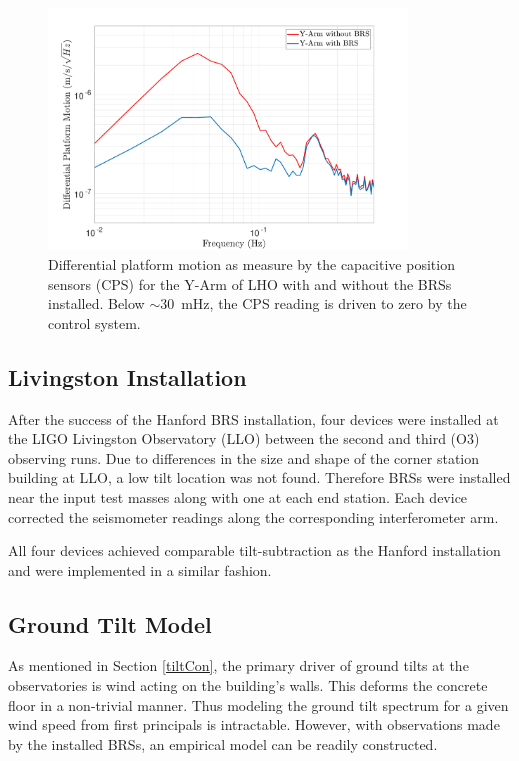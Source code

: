 \documentclass [12pt, proquest]{uwthesis}[2019]
\begin{document}
\begin{figure}[!h]
\begin{center}
\includegraphics[width=0.85\textwidth]{BRSArmMotion.pdf}
\caption[Differential platform motion ]{Differential platform motion as measure by the capacitive position sensors (CPS) for the Y-Arm of LHO with and without the BRSs installed. Below $\sim$30~mHz, the CPS reading is driven to zero by the control system.}
\label{armMotion}
\end{center}
\end{figure}

\subsection{Livingston Installation}

\quad After the success of the Hanford BRS installation, four devices were installed at the LIGO Livingston Observatory (LLO) between the second and third (O3) observing runs. Due to differences in the size and shape of the corner station building at LLO, a low tilt location was not found. Therefore BRSs were installed near the input test masses along with one at each end station. Each device corrected the seismometer readings along the corresponding interferometer arm. 

All four devices achieved comparable tilt-subtraction as the Hanford installation and were implemented in a similar fashion. 

\subsection{Ground Tilt Model}


As mentioned in Section \ref{tiltCon}, the primary driver of ground tilts at the observatories is wind acting on the building's walls. This deforms the concrete floor in a non-trivial manner. Thus modeling the ground tilt spectrum for a given wind speed from first principals is intractable. However, with observations made by the installed BRSs, an empirical model can be readily constructed.
\end{document}
